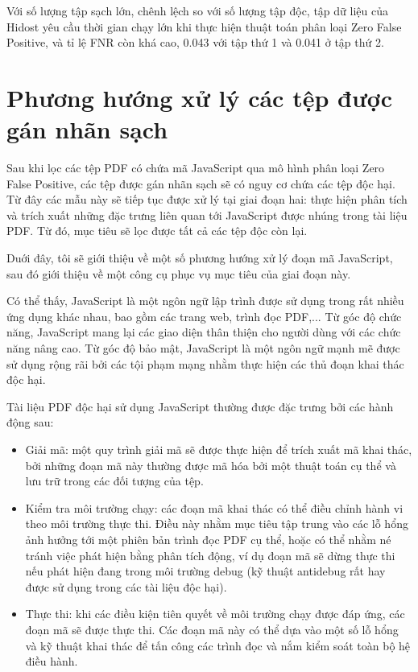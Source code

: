 \documentclass[./../main.tex]{subfiles}
\begin{document}
Với số lượng tập sạch lớn, chênh lệch so với số lượng tập độc, tập dữ liệu của Hidost yêu cầu thời gian chạy lớn khi thực hiện thuật toán phân loại Zero False Positive, và tỉ lệ FNR còn khá cao, 0.043 với tập thứ 1 và 0.041 ở tập thứ 2.

\section{Phương hướng xử lý các tệp được gán nhãn sạch}
Sau khi lọc các tệp PDF có chứa mã JavaScript qua mô hình phân loại Zero False Positive, các tệp được gán nhãn sạch sẽ có nguy cơ chứa các tệp độc hại. Từ đây các mẫu này sẽ tiếp tục được xử lý tại giai đoạn hai: thực hiện phân tích và trích xuất những đặc trưng liên quan tới JavaScript được nhúng trong tài liệu PDF. Từ đó, mục tiêu sẽ lọc được tất cả các tệp độc còn lại.

Duới đây, tôi sẽ giới thiệu về một số phương hướng xử lý đoạn mã JavaScript, sau đó giới thiệu về một công cụ phục vụ mục tiêu của giai đoạn này.


Có thể thấy, JavaScript là một ngôn ngữ lập trình được sử dụng trong rất nhiều ứng dụng khác nhau, bao gồm các trang web, trình đọc PDF,... Từ góc độ chức năng, JavaScript mang lại các giao diện thân thiện cho người dùng với các chức năng nâng cao. Từ góc độ bảo mật, JavaScript là một ngôn ngữ mạnh mẽ được sử dụng rộng rãi bởi các tội phạm mạng nhằm thực hiện các thủ đoạn khai thác độc hại.

Tài liệu PDF độc hại sử dụng JavaScript thường được đặc trưng bởi các hành động sau:
\begin{itemize}
	\item Giải mã: một quy trình giải mã sẽ được thực hiện để trích xuất mã khai thác, bởi những đoạn mã này thường được mã hóa bởi một thuật toán cụ thể và lưu trữ trong các đối tượng của tệp.
	\item Kiểm tra môi trường chạy: các đoạn mã khai thác có thể điều chỉnh hành vi theo môi trường thực thi. Điều này nhằm mục tiêu tập trung vào các lỗ hổng ảnh hưởng tới một phiên bản trình đọc PDF cụ thể, hoặc có thể nhằm né tránh việc phát hiện bằng phân tích động, ví dụ đoạn mã sẽ dừng thực thi nếu phát hiện đang trong môi trường debug (kỹ thuật antidebug rất hay được sử dụng trong các tài liệu độc hại).
	\item Thực thi: khi các điều kiện tiên quyết về môi trường chạy được đáp ứng, các đoạn mã sẽ được thực thi. Các đoạn mã này có thể dựa vào một số lỗ hổng và kỹ thuật khai thác để tấn công các trình đọc và nắm kiểm soát toàn bộ hệ điều hành.
\end{itemize}
\end{document}
